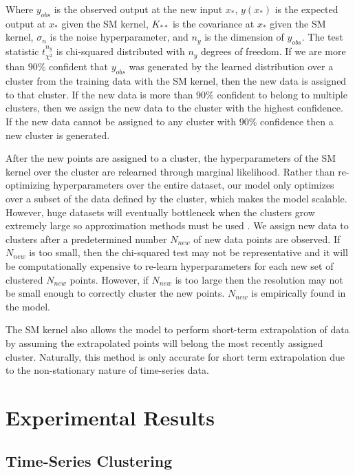 \documentclass{article}
\begin{document}
Where $y_{obs}$ is the observed output at the new input $x_{*}$, $y(x_{*})$ is the expected output at $x_{*}$ given the SM kernel, $K_{**}$ is the covariance at $x_{*}$ given the SM kernel, $\sigma_{n}$ is the noise hyperparameter, and ${n_{y}}$ is the dimension of $y_{obs}$. The test statistic $t_{\chi^{2}}^{n_{y}}$ is chi-squared distributed with ${n_{y}}$ degrees of freedom. If we are more than $90\%$ confident that $y_{obs}$ was generated by the learned distribution over a cluster from the training data with the SM kernel, then the new data is assigned to that cluster. If the new data is more than $90\%$ confident to belong to multiple clusters, then we assign the new data to the cluster with the highest confidence. If the new data cannot be assigned to any cluster with $90\%$ confidence then a new cluster is generated. 

After the new points are assigned to a cluster, the hyperparameters of the SM kernel over the cluster are relearned through marginal likelihood. Rather than re-optimizing hyperparameters over the entire dataset, our model only optimizes over a subset of the data defined by the cluster, which makes the model scalable. However, huge datasets will eventually bottleneck when the clusters grow extremely large so approximation methods must be used \cite{KISS-GP}. We assign new data to clusters after a predetermined number $N_{new}$ of new data points are observed. If $N_{new}$ is too small, then the chi-squared test may not be representative and it will be computationally expensive to re-learn hyperparameters for each new set of clustered $N_{new}$ points. However, if $N_{new}$ is too large then the resolution may not be small enough to correctly cluster the new points. $N_{new}$ is empirically found in the model.

The SM kernel also allows the model to perform short-term extrapolation of data by assuming the extrapolated points will belong the most recently assigned cluster. Naturally, this method is only accurate for short term extrapolation due to the non-stationary nature of time-series data.

\section{Experimental Results}

\subsection{Time-Series Clustering}
\end{document}
